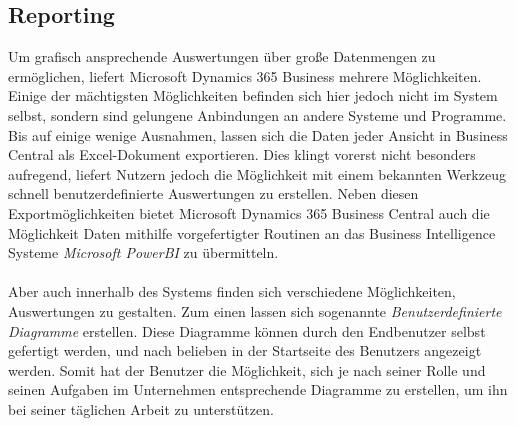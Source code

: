 \subsection{Reporting}
Um grafisch ansprechende Auswertungen über große Datenmengen zu ermöglichen, liefert Microsoft Dynamics 365 Business mehrere Möglichkeiten. Einige der mächtigsten Möglichkeiten befinden sich hier jedoch nicht im System selbst, sondern sind gelungene Anbindungen an andere Systeme und Programme. Bis auf einige wenige Ausnahmen, lassen sich die Daten jeder Ansicht in Business Central als Excel-Dokument exportieren. Dies klingt vorerst nicht besonders aufregend, liefert Nutzern jedoch die Möglichkeit mit einem bekannten Werkzeug schnell benutzerdefinierte Auswertungen zu erstellen. Neben diesen Exportmöglichkeiten bietet Microsoft Dynamics 365 Business Central auch die Möglichkeit Daten mithilfe vorgefertigter Routinen an das Business Intelligence Systeme \textit{Microsoft PowerBI} zu übermitteln. 
\paragraph{}

Aber auch innerhalb des Systems finden sich verschiedene Möglichkeiten, Auswertungen zu gestalten. Zum einen lassen sich sogenannte \textit{Benutzerdefinierte Diagramme} erstellen. Diese Diagramme können durch den Endbenutzer selbst gefertigt werden, und nach belieben in der Startseite des Benutzers angezeigt werden. Somit hat der Benutzer die Möglichkeit, sich je nach seiner Rolle und seinen Aufgaben im Unternehmen entsprechende Diagramme zu erstellen, um ihn bei seiner täglichen Arbeit zu unterstützen. 
\paragraph{}

